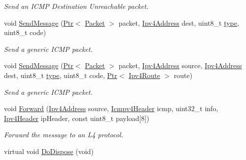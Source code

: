 \begin{DoxyCompactItemize}
\begin{DoxyCompactList}\small\item\em Send an I\+C\+MP Destination Unreachable packet. \end{DoxyCompactList}\item 
void \hyperlink{classns3_1_1Icmpv4L4Protocol_ae1ebe6f9f90bcb5f3d34efaffe4b37f3}{Send\+Message} (\hyperlink{classns3_1_1Ptr}{Ptr}$<$ \hyperlink{classns3_1_1Packet}{Packet} $>$ packet, \hyperlink{classns3_1_1Ipv4Address}{Ipv4\+Address} dest, uint8\+\_\+t \hyperlink{visualizer-ideas_8txt_add98db9e15e2a58cf2b57623e7aa893a}{type}, uint8\+\_\+t code)
\begin{DoxyCompactList}\small\item\em Send a generic I\+C\+MP packet. \end{DoxyCompactList}\item 
void \hyperlink{classns3_1_1Icmpv4L4Protocol_aae3de2e93f23c3fe6a1fbdc2d03a700c}{Send\+Message} (\hyperlink{classns3_1_1Ptr}{Ptr}$<$ \hyperlink{classns3_1_1Packet}{Packet} $>$ packet, \hyperlink{classns3_1_1Ipv4Address}{Ipv4\+Address} source, \hyperlink{classns3_1_1Ipv4Address}{Ipv4\+Address} dest, uint8\+\_\+t \hyperlink{visualizer-ideas_8txt_add98db9e15e2a58cf2b57623e7aa893a}{type}, uint8\+\_\+t code, \hyperlink{classns3_1_1Ptr}{Ptr}$<$ \hyperlink{classns3_1_1Ipv4Route}{Ipv4\+Route} $>$ route)
\begin{DoxyCompactList}\small\item\em Send a generic I\+C\+MP packet. \end{DoxyCompactList}\item 
void \hyperlink{classns3_1_1Icmpv4L4Protocol_afce6059188e5fef40631956771d9bad2}{Forward} (\hyperlink{classns3_1_1Ipv4Address}{Ipv4\+Address} source, \hyperlink{classns3_1_1Icmpv4Header}{Icmpv4\+Header} icmp, uint32\+\_\+t info, \hyperlink{classns3_1_1Ipv4Header}{Ipv4\+Header} ip\+Header, const uint8\+\_\+t payload\mbox{[}8\mbox{]})
\begin{DoxyCompactList}\small\item\em Forward the message to an L4 protocol. \end{DoxyCompactList}\item 
virtual void \hyperlink{classns3_1_1Icmpv4L4Protocol_aef6985eb19d9b18323efcd9bd0a074ac}{Do\+Dispose} (void)
\end{DoxyCompactItemize}
